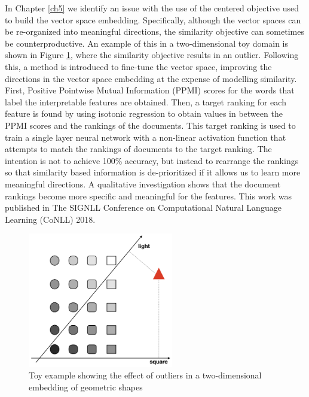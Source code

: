 In Chapter \ref{ch5} we identify an issue with the use of the  centered objective used to build the vector space embedding. Specifically, although the vector spaces can be re-organized into meaningful directions, the similarity objective can sometimes be counterproductive. An example of this in a two-dimensional toy domain is shown in Figure \ref{ch1:toyExample}, where the similarity objective results in an outlier. Following this, a method is introduced to fine-tune the vector space, improving the directions in the vector space embedding at the expense of modelling similarity. First, Positive Pointwise Mutual Information (PPMI) scores for the words that label the interpretable features are obtained. Then, a target ranking for each feature is found by using isotonic regression to obtain values in between the PPMI scores and the rankings of the documents. This target ranking is used to train a single layer neural network with a non-linear activation function that attempts to match the rankings of documents to the target ranking. The intention is not to achieve 100\% accuracy, but instead to rearrange the rankings so that similarity based information is de-prioritized if it allows us to learn more meaningful directions.  A qualitative investigation shows that the document rankings become more specific and meaningful for the features. This work was published in The SIGNLL Conference on Computational Natural Language Learning (CoNLL) 2018.

\begin{figure}
	\centering
	\includegraphics[width=180pt]{images/shapes}
	\caption{Toy example showing the effect of outliers in a two-dimensional embedding of geometric shapes}
	\label{ch1:toyExample}
\end{figure}


